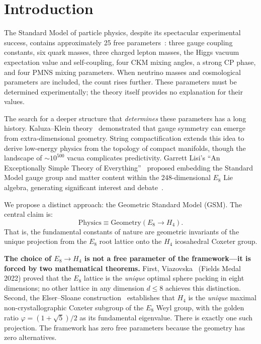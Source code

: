 \documentclass[aps,prd,twocolumn,superscriptaddress,nofootinbib,showpacs]{revtex4-2}
\begin{document}
\maketitle

\section{Introduction}\label{sec:intro}

The Standard Model of particle physics, despite its spectacular
experimental success, contains approximately 25 free
parameters~\cite{PDG2024}: three gauge coupling constants, six quark
masses, three charged lepton masses, the Higgs vacuum expectation value
and self-coupling, four CKM mixing angles, a strong CP phase, and four
PMNS mixing parameters.  When neutrino masses and cosmological
parameters are included, the count rises further.  These parameters
must be determined experimentally; the theory itself provides no
explanation for their values.

The search for a deeper structure that \emph{determines} these
parameters has a long history.  Kaluza--Klein
theory~\cite{KaluzaKlein} demonstrated that gauge symmetry can emerge
from extra-dimensional geometry.  String compactification extends this
idea to derive low-energy physics from the topology of compact
manifolds, though the landscape of $\sim\!10^{500}$ vacua complicates
predictivity.  Garrett Lisi's ``An Exceptionally Simple Theory of
Everything''~\cite{Lisi2007} proposed embedding the Standard Model
gauge group and matter content within the 248-dimensional $E_8$ Lie
algebra, generating significant interest and
debate~\cite{Distler2010}.

We propose a distinct approach: the Geometric Standard Model (GSM).
The central claim is:
\begin{equation}
\text{Physics} \equiv \text{Geometry}(E_8 \to H_4).
\label{eq:axiom}
\end{equation}
That is, the fundamental constants of nature are geometric invariants
of the unique projection from the $E_8$ root lattice onto the $H_4$
icosahedral Coxeter group.

\textbf{The choice of $E_8 \to H_4$ is not a free parameter of the
framework---it is forced by two mathematical theorems.}
First, Viazovska~\cite{Viazovska2016} (Fields Medal 2022) proved that
the $E_8$ lattice is the \emph{unique} optimal sphere packing in
eight dimensions; no other lattice in any dimension $d \leq 8$
achieves this distinction.  Second, the Elser--Sloane
construction~\cite{ElserSloane} establishes that $H_4$ is the
\emph{unique} maximal non-crystallographic Coxeter subgroup of
the $E_8$ Weyl group, with the golden ratio $\varphi = (1 +
\sqrt{5})/2$ as its fundamental eigenvalue.  There is exactly one
such projection.  The framework has zero free parameters because the
geometry has zero alternatives.
\end{document}
